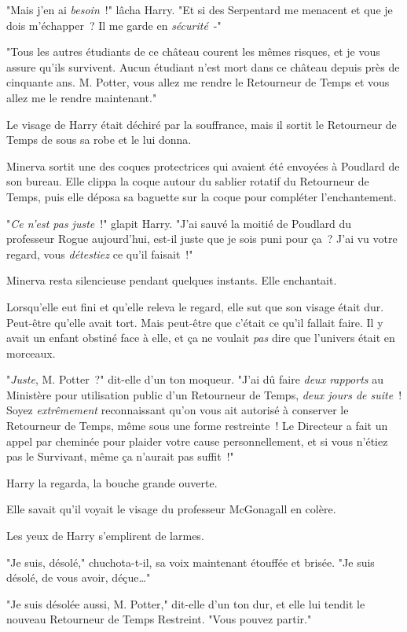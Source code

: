 "Mais j'en ai \emph{besoin}~!" lâcha Harry. "Et si des Serpentard me menacent et que je dois m'échapper~? Il me garde en \emph{sécurité}~-"

"Tous les autres étudiants de ce château courent les mêmes risques, et je vous assure qu'ils survivent. Aucun étudiant n'est mort dans ce château depuis près de cinquante ans. M. Potter, vous allez me rendre le Retourneur de Temps et vous allez me le rendre maintenant."

Le visage de Harry était déchiré par la souffrance, mais il sortit le Retourneur de Temps de sous sa robe et le lui donna.

Minerva sortit une des coques protectrices qui avaient été envoyées à Poudlard de son bureau. Elle clippa la coque autour du sablier rotatif du Retourneur de Temps, puis elle déposa sa baguette sur la coque pour compléter l'enchantement.

"\emph{Ce n'est pas juste}~!" glapit Harry. "J'ai sauvé la moitié de Poudlard du professeur Rogue aujourd'hui, est-il juste que je sois puni pour ça~? J'ai vu votre regard, vous \emph{détestiez} ce qu'il faisait~!"

Minerva resta silencieuse pendant quelques instants. Elle enchantait.

Lorsqu'elle eut fini et qu'elle releva le regard, elle sut que son visage était dur. Peut-être qu'elle avait tort. Mais peut-être que c'était ce qu'il fallait faire. Il y avait un enfant obstiné face à elle, et ça ne voulait \emph{pas} dire que l'univers était en morceaux.

"\emph{Juste}, M. Potter~?" dit-elle d'un ton moqueur. "J'ai dû faire \emph{deux rapports} au Ministère pour utilisation public d'un Retourneur de Temps, \emph{deux jours de suite}~! Soyez \emph{extrêmement} reconnaissant qu'on vous ait autorisé à conserver le Retourneur de Temps, même sous une forme restreinte~! Le Directeur a fait un appel par cheminée pour plaider votre cause personnellement, et si vous n'étiez pas le Survivant, même ça n'aurait pas suffit~!"

Harry la regarda, la bouche grande ouverte.

Elle savait qu'il voyait le visage du professeur McGonagall en colère.

Les yeux de Harry s'emplirent de larmes.

"Je suis, désolé," chuchota-t-il, sa voix maintenant étouffée et brisée. "Je suis désolé, de vous avoir, déçue…"

"Je suis désolée aussi, M. Potter," dit-elle d'un ton dur, et elle lui tendit le nouveau Retourneur de Temps Restreint. "Vous pouvez partir."

